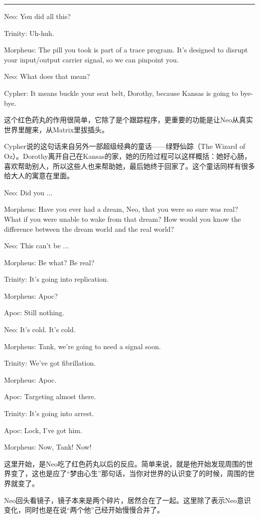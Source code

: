 \documentclass[UTF8]{ctexart}
\newcommand{\myparsep}{\noindent \rule[0.5ex]{\linewidth}{1pt}}
\newenvironment{myquote}{\color{green} \setlength{\leftskip}{6em} \setlength{\rightskip}{4em} \setlength{\parindent}{-2em}}{\par}
\begin{document}
\myparsep

\begin{myquote}
Neo: You did all this?

Trinity: Uh-huh.

Morpheus: The pill you took is part of a trace program. It's designed to disrupt your input/output carrier signal, so we can pinpoint you.

Neo: What does that mean?

Cypher: It means buckle your seat belt, Dorothy, because Kansas is going to bye-bye.
\end{myquote}

这个红色药丸的作用很简单，它除了是个跟踪程序，更重要的功能是让Neo从真实世界里醒来，从Matrix里拔插头。

Cypher说的这句话来自另外一部超级经典的童话——绿野仙踪（The Wizard of Oz）。Dorothy离开自己在Kansas的家，她的历险过程可以这样概括：她好心肠，喜欢帮助别人，所以这些人也来帮助她，最后她终于回家了。这个童话同样有很多给大人的寓意在里面。

\begin{myquote}
Neo: Did you ...

Morpheus: Have you ever had a dream, Neo, that you were so sure was real? What if you were unable to wake from that dream? How would you know the difference between the dream world and the real world?

Neo: This can't be ...

Morpheus: Be what? Be real?

Trinity: It's going into replication.

Morpheus: Apoc?

Apoc: Still nothing.

Neo: It's cold. It's cold.

Morpheus: Tank, we're going to need a signal soon.

Trinity: We've got fibrillation.

Morpheus: Apoc.

Apoc: Targeting almost there.

Trinity: It's going into arrest.

Apoc: Lock, I've got him.

Morpheus: Now, Tank! Now!
\end{myquote}

这里开始，是Neo吃了红色药丸以后的反应。简单来说，就是他开始发现周围的世界变了，这也是应了“梦由心生”那句话，当你对世界的认识变了的时候，周围的世界就变了。

Neo回头看镜子，镜子本来是两个碎片，居然合在了一起。这里除了表示Neo意识变化，同时也是在说“两个他”己经开始慢慢合并了。
\end{document}
